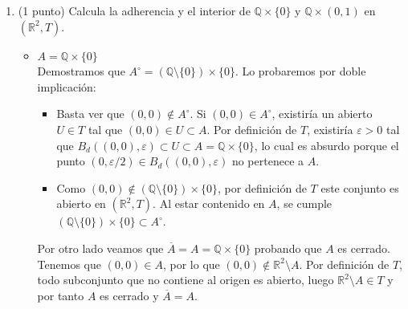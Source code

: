 \documentclass[12pt]{article}
\begin{document}
\begin{ejercicio}
\begin{enumerate}
        \item (1 punto) Calcula la adherencia y el interior de $\mathbb{Q} \times \{0\}$ y $\mathbb{Q} \times (0,1)$ en $(\mathbb{R}^2, T)$.
        \begin{itemize}
        \item $A = \mathbb{Q} \times \{0\}$\\
        Demostramos que $A^{\circ} = (\mathbb{Q}\setminus \{0\}) \times \{0\}$. Lo probaremos por doble implicación:
        \begin{itemize}
            \item[$\subseteq$] Basta ver que $(0,0) \notin A^{\circ}$. Si $(0,0) \in A^{\circ}$, existiría un abierto $U \in T$ tal que $(0,0) \in U \subset A$. Por definición de $T$, existiría $\varepsilon > 0$ tal que $B_d((0,0), \varepsilon) \subset U \subset A = \mathbb{Q} \times \{0\}$, lo cual es absurdo porque el punto $(0, \varepsilon/2) \in B_d((0,0), \varepsilon)$ no pertenece a $A$.
            \item[$\supseteq$] Como $(0,0) \notin (\mathbb{Q}\setminus \{0\}) \times \{0\}$, por definición de $T$ este conjunto es abierto en $(\mathbb{R}^2, T)$. Al estar contenido en $A$, se cumple $(\mathbb{Q}\setminus \{0\}) \times \{0\} \subset A^{\circ}$.
        \end{itemize}

        Por otro lado veamos que $\overline{A} = A = \mathbb{Q} \times \{0\}$ probando que $A$ es cerrado. Tenemos que $(0,0) \in A$, por lo que $(0,0) \notin \mathbb{R}^2 \setminus A$. Por definición de $T$, todo subconjunto que no contiene al origen es abierto, luego $\mathbb{R}^2 \setminus A \in T$ y por tanto $A$ es cerrado y $\overline{A} = A$.
        \begin{figure}[h!]
        \centering
\end{figure}
\end{itemize}
\end{enumerate}
\end{ejercicio}
\end{document}
